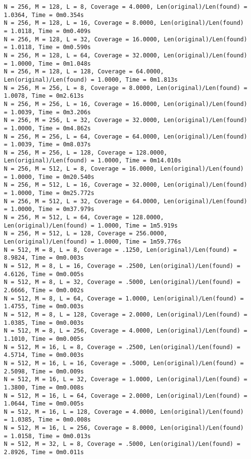 \documentclass{article}
\begin{document}
{\begin{verbatim}
N = 256, M = 128, L = 8, Coverage = 4.0000, Len(original)/Len(found) = 1.0364, Time = 0m0.354s
N = 256, M = 128, L = 16, Coverage = 8.0000, Len(original)/Len(found) = 1.0118, Time = 0m0.409s
N = 256, M = 128, L = 32, Coverage = 16.0000, Len(original)/Len(found) = 1.0118, Time = 0m0.590s
N = 256, M = 128, L = 64, Coverage = 32.0000, Len(original)/Len(found) = 1.0000, Time = 0m1.048s
N = 256, M = 128, L = 128, Coverage = 64.0000, Len(original)/Len(found) = 1.0000, Time = 0m1.813s
N = 256, M = 256, L = 8, Coverage = 8.0000, Len(original)/Len(found) = 1.0078, Time = 0m2.613s
N = 256, M = 256, L = 16, Coverage = 16.0000, Len(original)/Len(found) = 1.0039, Time = 0m3.206s
N = 256, M = 256, L = 32, Coverage = 32.0000, Len(original)/Len(found) = 1.0000, Time = 0m4.862s
N = 256, M = 256, L = 64, Coverage = 64.0000, Len(original)/Len(found) = 1.0039, Time = 0m8.037s
N = 256, M = 256, L = 128, Coverage = 128.0000, Len(original)/Len(found) = 1.0000, Time = 0m14.010s
N = 256, M = 512, L = 8, Coverage = 16.0000, Len(original)/Len(found) = 1.0000, Time = 0m20.540s
N = 256, M = 512, L = 16, Coverage = 32.0000, Len(original)/Len(found) = 1.0000, Time = 0m25.772s
N = 256, M = 512, L = 32, Coverage = 64.0000, Len(original)/Len(found) = 1.0000, Time = 0m37.979s
N = 256, M = 512, L = 64, Coverage = 128.0000, Len(original)/Len(found) = 1.0000, Time = 1m5.919s
N = 256, M = 512, L = 128, Coverage = 256.0000, Len(original)/Len(found) = 1.0000, Time = 1m59.776s
N = 512, M = 8, L = 8, Coverage = .1250, Len(original)/Len(found) = 8.9824, Time = 0m0.003s
N = 512, M = 8, L = 16, Coverage = .2500, Len(original)/Len(found) = 4.6126, Time = 0m0.005s
N = 512, M = 8, L = 32, Coverage = .5000, Len(original)/Len(found) = 2.6666, Time = 0m0.002s
N = 512, M = 8, L = 64, Coverage = 1.0000, Len(original)/Len(found) = 1.4755, Time = 0m0.003s
N = 512, M = 8, L = 128, Coverage = 2.0000, Len(original)/Len(found) = 1.0385, Time = 0m0.003s
N = 512, M = 8, L = 256, Coverage = 4.0000, Len(original)/Len(found) = 1.1010, Time = 0m0.005s
N = 512, M = 16, L = 8, Coverage = .2500, Len(original)/Len(found) = 4.5714, Time = 0m0.003s
N = 512, M = 16, L = 16, Coverage = .5000, Len(original)/Len(found) = 2.5098, Time = 0m0.009s
N = 512, M = 16, L = 32, Coverage = 1.0000, Len(original)/Len(found) = 1.3800, Time = 0m0.008s
N = 512, M = 16, L = 64, Coverage = 2.0000, Len(original)/Len(found) = 1.0644, Time = 0m0.005s
N = 512, M = 16, L = 128, Coverage = 4.0000, Len(original)/Len(found) = 1.0385, Time = 0m0.008s
N = 512, M = 16, L = 256, Coverage = 8.0000, Len(original)/Len(found) = 1.0158, Time = 0m0.013s
N = 512, M = 32, L = 8, Coverage = .5000, Len(original)/Len(found) = 2.8926, Time = 0m0.011s

\end{verbatim}}
\end{document}
